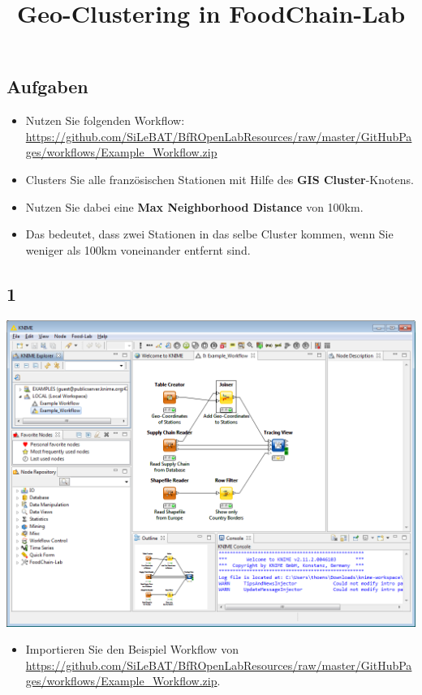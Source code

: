 \documentclass{beamer}
\title{Geo-Clustering in FoodChain-Lab}
\date{}
\begin{document}
\maketitle

\section{ }

\subsection{Aufgaben}
\begin{frame}
	\begin{itemize}
		\item Nutzen Sie folgenden Workflow: \url{https://github.com/SiLeBAT/BfROpenLabResources/raw/master/GitHubPages/workflows/Example_Workflow.zip}
		\item Clusters Sie alle französischen Stationen mit Hilfe des \textbf{GIS Cluster}-Knotens.
		\item Nutzen Sie dabei eine \textbf{Max Neighborhood Distance} von 100km.
		\item Das bedeutet, dass zwei Stationen in das selbe Cluster kommen, wenn Sie weniger als 100km voneinander entfernt sind.
	\end{itemize}
\end{frame}
 
\subsection{1}
\begin{frame}
	\begin{center}
  		\includegraphics[height=0.6\textheight]{1.png}
	\end{center}
	\begin{itemize}
		\item Importieren Sie den Beispiel Workflow von \url{https://github.com/SiLeBAT/BfROpenLabResources/raw/master/GitHubPages/workflows/Example_Workflow.zip}.
	\end{itemize}
\end{frame}
\end{document}
